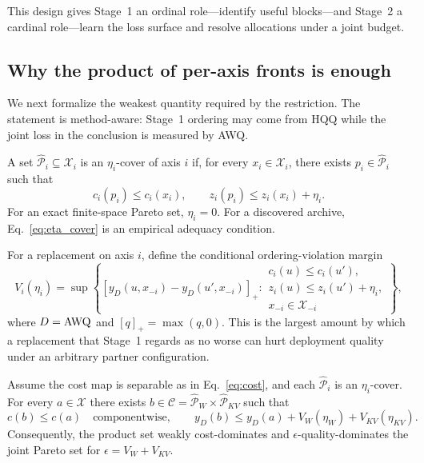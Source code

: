 This design gives Stage~1 an ordinal role---identify useful blocks---and Stage~2
a cardinal role---learn the loss surface and resolve allocations under a joint
budget.

\subsection{Why the product of per-axis fronts is enough}
\label{sec:coverage}

We next formalize the weakest quantity required by the restriction.  The
statement is method-aware: Stage~1 ordering may come from HQQ while the joint
loss in the conclusion is measured by AWQ.

\begin{definition}
A set $\widehat{\mathcal{P}}_i\subseteq\mathcal{X}_i$ is an $\eta_i$-cover of
axis $i$ if, for every $x_i\in\mathcal{X}_i$, there exists
$p_i\in\widehat{\mathcal{P}}_i$ such that
\begin{equation}
  c_i(p_i)\le c_i(x_i),\qquad
  z_i(p_i)\le z_i(x_i)+\eta_i.
  \label{eq:eta_cover}
\end{equation}
For an exact finite-space Pareto set, $\eta_i=0$.  For a discovered archive,
Eq.~\eqref{eq:eta_cover} is an empirical adequacy condition.
\end{definition}

For a replacement on axis $i$, define the conditional ordering-violation
margin
\begin{equation}
 V_i(\eta_i)=
 \sup\!\left\{
 \left[y_D(u,x_{-i})-y_D(u',x_{-i})\right]_+:
 \begin{array}{l}
 c_i(u)\le c_i(u'),\\[-2pt]
 z_i(u)\le z_i(u')+\eta_i,\\[-2pt]
 x_{-i}\in\mathcal{X}_{-i}
 \end{array}\right\},
 \label{eq:violation}
\end{equation}
where $D=\mathrm{AWQ}$ and $[q]_+=\max(q,0)$.  This is the largest amount by which a
replacement that Stage~1 regards as no worse can hurt deployment quality under
an arbitrary partner configuration.

\begin{theorem}
\label{thm:coverage}
Assume the cost map is separable as in Eq.~\eqref{eq:cost}, and each
$\widehat{\mathcal{P}}_i$ is an $\eta_i$-cover.  For every
$a\in\mathcal{X}$ there exists
$b\in\mathcal{C}=\widehat{\mathcal{P}}_W\times
\widehat{\mathcal{P}}_{KV}$ such that
\begin{equation}
  c(b)\le c(a)\quad\text{componentwise},\qquad
  y_D(b)\le y_D(a)+V_W(\eta_W)+V_{KV}(\eta_{KV}).
  \label{eq:coverage_bound}
\end{equation}
Consequently, the product set weakly cost-dominates and
$\epsilon$-quality-dominates the joint Pareto set for
$\epsilon=V_W+V_{KV}$.
\end{theorem}

